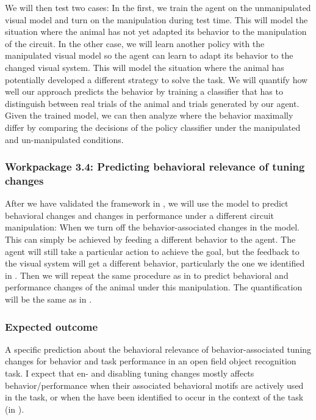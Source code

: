 \documentclass[B2,COG]{ercgrant}
\begin{document}
We will then test two cases: In the first, we train the agent on the unmanipulated visual model and turn on the manipulation during test time. 
This will model the situation where the animal has not yet adapted its behavior to the manipulation of the circuit. 
In the other case, we will learn another policy with the manipulated visual model so the agent can learn to adapt its behavior to the changed visual system. 
This will model the situation where the animal has potentially developed a different strategy to solve the task. 
We will quantify how well our approach predicts the behavior by training a classifier that has to distinguish between real trials of the animal and trials generated by our agent. 
Given the trained model, we can then analyze where the behavior maximally differ by comparing the decisions of the policy classifier under the manipulated and un-manipulated conditions. 

\subsubsection{Workpackage 3.4: Predicting behavioral relevance of tuning changes\hfill{}}

After we have validated the framework in , we will use the model to predict behavioral changes and changes in performance under a different circuit manipulation: When we turn off the behavior-associated changes in the model. 
This can simply be achieved by feeding a different behavior to the agent. 
The agent will still take a particular action to achieve the goal, but the feedback to the visual system will get a different behavior, particularly the one we identified in .
Then we will repeat the same procedure as in  to predict behavioral and performance changes of the animal under this manipulation. 
The quantification will be the same as in .

\subsubsection{Expected outcome} 
A specific prediction about the behavioral relevance of behavior-associated tuning changes for behavior and task performance in  an open field object recognition task. 
I expect that en- and disabling tuning changes mostly affects behavior/performance when their associated behavioral motifs are actively used in the task, or when the have been identified to occur in the context of the task (in ).
\end{document}
